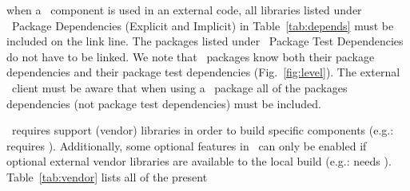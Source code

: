 when a \draco\ component is used in an external code, all libraries
listed under \draco\ Package Dependencies (Explicit and Implicit) in
Table~\ref{tab:depends} must be included on the link line.  The
packages listed under \draco\ Package Test Dependencies do not have to
be linked.  We note that \draco\ packages know both their package
dependencies and their package test
dependencies (Fig.~\ref{fig:level}).  The external \draco\ client
must be aware that when using a \draco\ package all of the packages
dependencies (not package test dependencies) must be included.

\draco\ requires support (vendor) libraries in order to build specific components (e.g.:  requires ).  Additionally, some optional features in \draco\ can only be enabled if optional external vendor libraries are available to the local build (e.g.:  needs ).  Table~\ref{tab:vendor} lists all of the present
